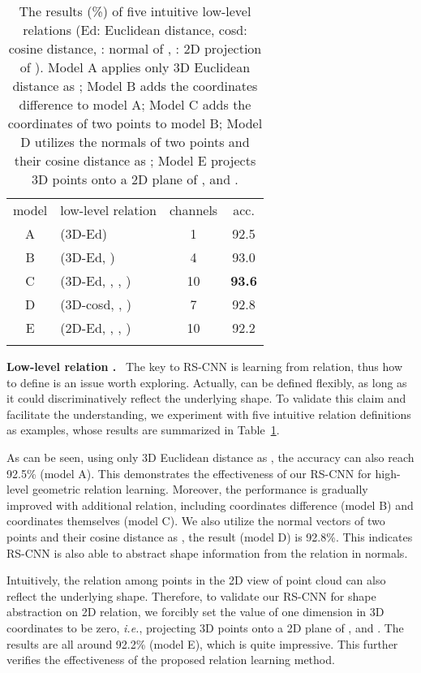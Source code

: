 \documentclass[10pt,twocolumn,letterpaper]{article}
\begin{document}
\begin{table}[t]
  \centering
\small
  \caption{The results (\%) of five intuitive low-level relations  (Ed: Euclidean distance, cosd: cosine distance, : normal of , : 2D projection of ). Model A applies only 3D Euclidean distance as ; Model B adds the coordinates difference to model A; Model C adds the coordinates of two points to model B; Model D utilizes the normals of two points and their cosine distance as ; Model E projects 3D points onto a 2D plane of ,  and .}
  \begin{tabular}{c|lc|c}
  \Xhline{0.8pt}
  model & low-level relation  & channels & acc. \\
\Xhline{0.5pt}
  A & (3D-Ed) & 1 & 92.5 \\
  B & (3D-Ed, ) & 4 & 93.0  \\
  C & (3D-Ed, , , ) & 10 & \textbf{93.6} \\
  D & (3D-cosd, , ) & 7 & 92.8 \\
  E & (2D-Ed, , , ) & 10 &  92.2  \\
  \Xhline{0.8pt}
  \end{tabular}
  \label{Tab6:relation}
\end{table}

\vspace{12pt}
\noindent \textbf{Low-level relation .}\,\,~The key to RS-CNN is learning from relation, thus how to define  is an issue worth exploring. Actually,  can be defined flexibly, as long as it could discriminatively reflect the underlying shape. To validate this claim and facilitate the understanding, we experiment with five intuitive relation definitions as examples, whose results are summarized in Table~\ref{Tab6:relation}.

As can be seen, using only 3D Euclidean distance as , the accuracy can also reach 92.5\% (model A). This demonstrates the effectiveness of our RS-CNN for high-level geometric relation learning. Moreover, the performance is gradually improved with additional relation, including coordinates difference (model B) and coordinates themselves (model C). We also utilize the normal vectors of two points and their cosine distance as , the result (model D) is 92.8\%. This indicates RS-CNN is also able to abstract shape information from the relation in normals.

Intuitively, the relation among points in the 2D view of point cloud can also reflect the underlying shape. Therefore, to validate our RS-CNN for shape abstraction on 2D relation, we forcibly set the value of one dimension in 3D coordinates to be zero, \textit{i.e.}, projecting 3D points onto a 2D plane of ,  and . The results are all around 92.2\% (model E), which is quite impressive. This further verifies the effectiveness of the proposed relation learning method.
\end{document}
